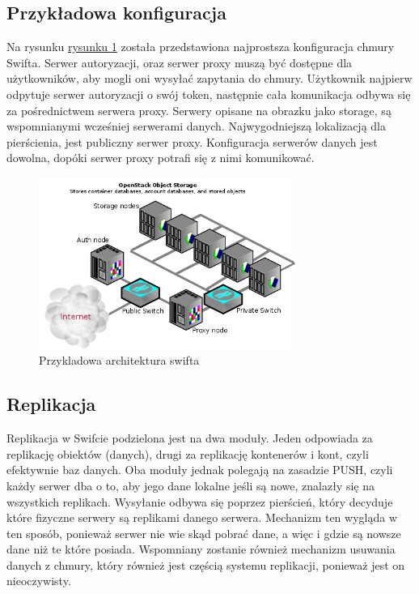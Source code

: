 \subsection{Przykładowa konfiguracja}\label{sub:przykladowa konfiguracja}

Na rysunku \hyperref[fig:swift_arch]{rysunku \ref{fig:swift_arch}} została przedstawiona najprostsza konfiguracja chmury Swifta. Serwer autoryzacji, oraz serwer proxy muszą być dostępne dla użytkowników, aby mogli oni wysyłać zapytania do chmury. Użytkownik najpierw odpytuje serwer autoryzacji o swój token, następnie cała komunikacja odbywa się za pośrednictwem serwera proxy. Serwery opisane na obrazku jako storage, są wspomnianymi wcześniej serwerami danych. Najwygodniejszą lokalizacją dla pierścienia, jest publiczny serwer proxy. Konfiguracja serwerów danych jest dowolna, dopóki serwer proxy potrafi się z nimi komunikować.

\begin{figure}
\centering
	\includegraphics[width=0.75\textwidth]{swift_install_arch.png}
	\caption{Przykladowa architektura swifta~\cite{swift_manual}}
\label{fig:swift_arch}
\end{figure}


\subsection{Replikacja}\label{sec:replikacja}

Replikacja w Swifcie podzielona jest na dwa moduły. Jeden odpowiada za replikację obiektów (danych), drugi za replikację kontenerów i kont, czyli efektywnie baz danych. Oba moduły jednak polegają na zasadzie PUSH, czyli każdy serwer dba o to, aby jego dane lokalne jeśli są nowe, znalazły się na wszystkich replikach. Wysyłanie odbywa się poprzez pierścień, który decyduje które fizyczne serwery są replikami danego serwera. Mechanizm ten wygląda w ten sposób, ponieważ serwer nie wie skąd pobrać dane, a więc i gdzie są nowsze dane niż te które posiada. Wspomniany zostanie również mechanizm usuwania danych z chmury, który również jest częścią systemu replikacji, ponieważ jest on nieoczywisty. 

